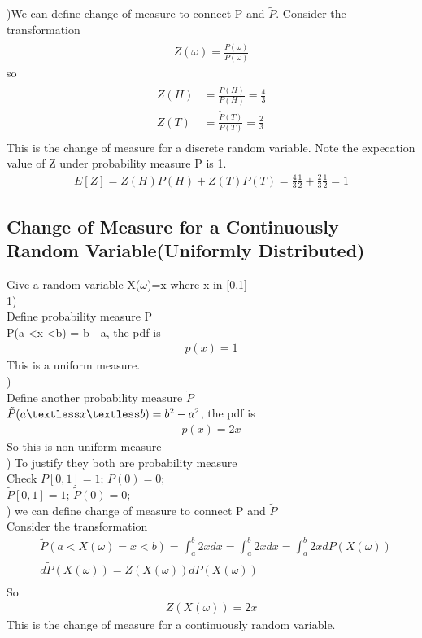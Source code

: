 \documentclass[a4paper]{article}
\begin{document}
)We can define change of measure to connect P and $\tilde P$. Consider the transformation 
\begin{align*}
	Z(\omega) = \frac{\tilde P(\omega)}{P(\omega)}
\end{align*}
so 
\begin{align*}
	Z(H) & = \frac{\tilde P(H)}{P(H)} = \frac{4}{3}\\
	Z(T) & = \frac{\tilde P(T)}{P(T)} = \frac{2}{3}\\
\end{align*}
This is the change of measure for a discrete random variable. Note the expecation value of Z under probability measure P is 1.
\begin{align*}
	E[Z] = Z(H)P(H) + Z(T)P(T) = \frac{4}{3} \frac{1}{2} + \frac{2}{3} \frac{1}{2} = 1
\end{align*}
\subsection{Change of Measure for a Continuously Random Variable(Uniformly Distributed) } 
Give a random variable  X($\omega$)=x where x in [0,1]\\
1)\\
Define probability measure P \\
P(a \textless x \textless b) = b - a, the pdf is 
\begin{align*}
p(x) = 1	
\end{align*}
This is a uniform measure.\\

)\\
Define another probability measure $\tilde P$\\
$\tilde P(a \textless x  \textless b) = b^2 - a^2$, the pdf is 
\begin{align*}
p(x) = 2x
\end{align*}
So this is non-uniform measure\\


)	To justify they both are probability measure\\
Check  $P[0,1] = 1$; $P(0)=0$;\\
       $\tilde P[0,1] =1$; $\tilde P(0)=0$;\\


) we can define change of measure to connect P and $\tilde P$ \\
Consider the transformation \\
\begin{align*}
	&\tilde P(a < X(\omega) = x < b) = \int _a ^b 2x dx = \int _a ^b 2x dx = \int_a ^b 2x dP(X(\omega))\\
	&d\tilde P(X(\omega)) = Z(X(\omega)) dP(X(\omega)) \\
\end{align*}
So
\begin{align*}
	Z(X(\omega))= 2x
\end{align*}
This is the change of measure for a continuously random variable. \\
\end{document}
